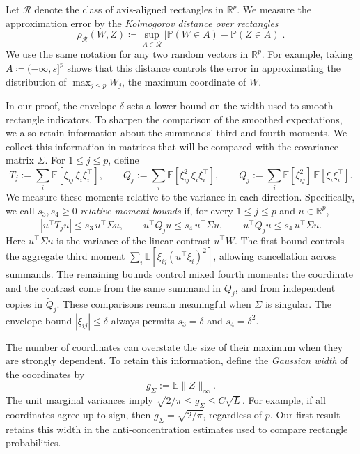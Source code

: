 \documentclass[11pt,letterpaper]{article}
\newenvironment{recovered}{}{}
\theoremstyle{remark}
\newcommand{\E}{\mathbb E}
\newcommand{\Pp}{\mathbb P}
\newcommand{\R}{\mathbb R}
\newcommand{\rh}{\rho_{\mathcal R}}
\begin{document}
Let \(\mathcal R\) denote the class of axis-aligned rectangles in
\(\R^p\). We measure the approximation error by the \emph{Kolmogorov distance over rectangles}
\[
 \rh(W,Z)\coloneqq \sup_{A\in\mathcal R}
       |\Pp(W\in A)-\Pp(Z\in A)|.
\]
We use the same notation for any two random vectors in \(\R^p\). For
example, taking \(A\coloneqq (-\infty,s]^p\) shows that this distance controls the
error in approximating the distribution of \(\max_{j\le p}W_j\), the maximum
coordinate of \(W\).

\begin{recovered}
In our proof, the envelope \(\delta\) sets a lower bound on the width
used to smooth rectangle indicators. To sharpen the comparison of the
smoothed expectations, we also retain information about the summands'
third and fourth moments. We collect this information in matrices that
will be compared with the covariance matrix \(\Sigma\). For
\(1\le j\le p\), define
\[
 T_j:=\sum_i\E[\xi_{ij}\,\xi_i\xi_i^\top],\qquad
 Q_j:=\sum_i\E[\xi_{ij}^2\,\xi_i\xi_i^\top],\qquad
 \widetilde Q_j:=\sum_i\E[\xi_{ij}^2]\,\E[\xi_i\xi_i^\top].
\]
We measure these moments relative to the variance in each direction.
Specifically, we call \(s_3,s_4\ge0\) \emph{relative moment bounds} if,
for every \(1\le j\le p\) and \(u\in\R^p\),
\begin{equation}\label{eq:relative-moments}
 |u^\top T_j u|\le s_3\,u^\top\Sigma u,\qquad
 u^\top Q_j u\le s_4\,u^\top\Sigma u,\qquad
 u^\top\widetilde Q_j u\le s_4\,u^\top\Sigma u.
\end{equation}
Here \(u^\top\Sigma u\) is the variance of the linear contrast
\(u^\top W\). The first bound controls the aggregate third moment
\(\sum_i\E[\xi_{ij}(u^\top\xi_i)^2]\), allowing cancellation across
summands. The remaining bounds control mixed fourth moments: the
coordinate and the contrast come from the same summand in \(Q_j\),
and from independent copies in \(\widetilde Q_j\). These comparisons
remain meaningful when \(\Sigma\) is singular. The envelope bound
\(|\xi_{ij}|\le\delta\) always permits \(s_3=\delta\) and
\(s_4=\delta^2\).
\end{recovered}

The number of coordinates can overstate the size of their maximum
when they are strongly dependent. To retain this information, define
the \emph{Gaussian width} of the coordinates by
\[
 g_\Sigma:=\E\|Z\|_\infty.
\]
The unit marginal variances imply
\(\sqrt{2/\pi}\le g_\Sigma\le C\sqrt L\). For example, if all
coordinates agree up to sign, then \(g_\Sigma=\sqrt{2/\pi}\),
regardless of \(p\). Our first result retains this width in the
anti-concentration estimates used to compare rectangle probabilities.
\end{document}
